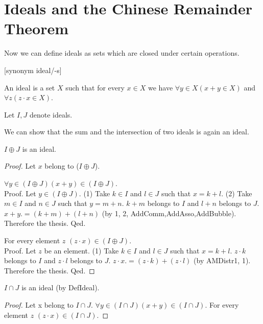 \documentclass{article}
\begin{document}
  \section{Ideals and the Chinese Remainder Theorem}

  Now we can define ideals as sets which are closed under certain operations.

  \begin{forthel}

    [synonym ideal/-s]

    \begin{definition}[DefIdeal]
      An ideal is a set $X$ such that for every $x \in X$ we have
        $\forall y \in X (x + y \in X)$ and
        $\forall z (z \cdot x \in X)$.
    \end{definition}

    Let $I,J$ denote ideals.
  \end{forthel}

  We can show that the sum and the intersection of two ideals is again an ideal.

  \begin{forthel}
    \begin{lemma}[IdeSum]
      $I \oplus J$ is an ideal.
    \end{lemma}
    \begin{proof}
      Let $x$ belong to ($I \oplus J$).

      $\forall y \in (I \oplus J) (x + y) \in (I \oplus J)$. \\
      Proof.
        Let $y \in (I \oplus J)$.
        (1) Take $k \in I$ and $l \in J$ such that $x = k + l$.
        (2) Take $m \in I$ and $n \in J$ such that $y = m + n$.
        $k + m$ belongs to $I$ and $l + n$ belongs to $J$. $x + y .= (k + m) + (l + n)$ (by 1, 2, AddComm,AddAsso,AddBubble). Therefore the thesis.
      Qed.

      For every element $z$ $(z \cdot x) \in (I \oplus J)$. \\
      Proof.
        Let $z$ be an element.
        (1) Take $k \in I$ and $l \in J$ such that $x = k + l$.
        $z \cdot k$ belongs to $I$ and $z \cdot l$ belongs to $J$. $z \cdot x .= (z \cdot k) + (z \cdot l)$ (by AMDistr1, 1). Therefore the thesis.
      Qed.
    \end{proof}


    \begin{lemma}[IdeInt]
      $I \cap J$ is an ideal (by DefIdeal).
    \end{lemma}
    \begin{proof}
      Let x belong to $I \cap J$. $\forall y \in (I \cap J) (x + y) \in (I \cap J)$. For every element $z$ $(z \cdot x) \in (I \cap J)$.
    \end{proof}
  \end{forthel}
\end{document}

